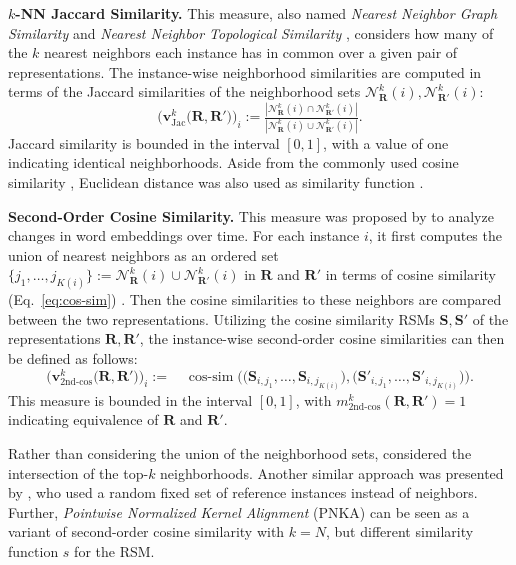 \documentclass{article}
\newcommand{\citet}{\textcite}
\newcommand{\R}{\bm{R}}
\newcommand{\Rp}{\bm{R'}}
\newcommand{\Sm}{\bm{S}}
\newcommand\myeqref[1]{%
    (\textup{Eq.~\ref{#1}})%
}
\newcommand{\subheader}{\textbf}
\begin{document}
\subheader{$k$-NN Jaccard Similarity.}
This measure, also named \emph{Nearest Neighbor Graph Similarity} \cite{gwilliam_beyond_2022} and \emph{Nearest Neighbor Topological Similarity} \cite{hryniowski_inter-layer_2020}, considers how many of the $k$ nearest neighbors each instance has in common over a given pair of representations.
The instance-wise neighborhood similarities are computed in terms of the Jaccard similarities of the neighborhood sets $\mathcal{N}^k_{\R}(i),\mathcal{N}^k_{\Rp}(i)$:
\begin{equation} \label{eq:jaccard}
\big(\bm{v}_\text{Jac}^k\big(\R, \Rp\big)\big)_i :=
\tfrac{|\mathcal{N}^k_{\R}(i)\cap \mathcal{N}^k_{\Rp}(i)|}{|\mathcal{N}^k_{\R}(i)\cup \mathcal{N}^k_{\Rp}(i)|}.
\end{equation}
Jaccard similarity is bounded in the interval $[0,1]$, with a value of one indicating identical neighborhoods.
Aside from the commonly used cosine similarity \cite{schumacher_effects_2021, wang_towards_2020}, Euclidean distance was also used as similarity function \cite{hryniowski_inter-layer_2020}.


\subheader{Second-Order Cosine Similarity.}
This measure was proposed by \citet{hamilton_cultural_2016} to analyze changes in word embeddings over time.
For each instance $i$, it first computes the union of nearest neighbors as an ordered set $\{j_1,\dots, j_{K(i)}\}:=\mathcal{N}^k_{\R}(i)\cup \mathcal{N}^k_{\Rp}(i)$ in $\R$ and $\Rp$ in terms of cosine similarity \myeqref{eq:cos-sim}.
Then the cosine similarities to these neighbors are compared between the two representations.
Utilizing the cosine similarity RSMs $\Sm, \Sm'$ of the representations $\R, \Rp$, the instance-wise second-order cosine similarities can then be defined as follows:
\begin{equation}\label{eq:2ndcos}
\big(\bm{v}_\text{2nd-cos}^k\big(\R, \Rp\big)\big)_i:=  \quad \operatorname{cos-sim}\big(\big(\Sm_{i,j_1},\dots, \Sm_{i,j_{K(i)}}\big),\big(\Sm'_{i,j_1},\dots, \Sm'_{i,j_{K(i)}}\big)\big). \nonumber
\end{equation}
This measure is bounded in the interval $[0,1]$, with $m_\text{2nd-cos}^k(\R, \Rp) = 1$ indicating equivalence of $\R$ and $\Rp$.

Rather than considering the union of the neighborhood sets, \citet{chen_graph-based_2021} considered the intersection of the top-$k$ neighborhoods.
Another similar approach was presented by \citet{moschella_relative_2023}, who used a random fixed set of reference instances instead of neighbors.
Further, \emph{Pointwise Normalized Kernel Alignment} (PNKA) \cite{kolling_pointwise_2023} can be seen as a variant of second-order cosine similarity with $k=N$, but different similarity function $s$ for the RSM.
\end{document}
